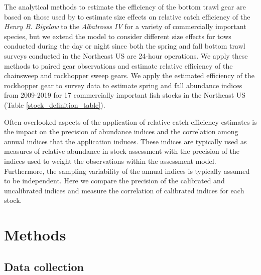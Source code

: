 \documentclass[
  12pt,
]{article}
\begin{document}
The analytical methods to estimate the efficiency of the bottom trawl
gear are based on those used by \citet{miller13} to estimate size
effects on relative catch efficiency of the \emph{Henry B. Bigelow} to
the \emph{Albatrosss IV} for a variety of commercially important
species, but we extend the model to consider different size effects for
tows conducted during the day or night since both the spring and fall
bottom trawl surveys conducted in the Northeast US are 24-hour
operations. We apply these methods to paired gear observations and
estimate relative efficiency of the chainsweep and rockhopper sweep
gears. We apply the estimated efficiency of the rockhopper gear to
survey data to estimate spring and fall abundance indices from 2009-2019
for 17 commercially important fish stocks in the Northeast US (Table
\ref{stock_definition_table}).

Often overlooked aspects of the application of relative catch efficiency
estimates is the impact on the precision of abundance indices and the
correlation among annual indices that the application induces. These
indices are typically used as measures of relative abundance in stock
assessment with the precision of the indices used to weight the
observations within the assessment model. Furthermore, the sampling
variability of the annual indices is typically assumed to be
independent. Here we compare the precision of the calibrated and
uncalibrated indices and measure the correlation of calibrated indices
for each stock.

\hypertarget{methods}{%
\section{Methods}\label{methods}}

\hypertarget{data-collection}{%
\subsection{Data collection}\label{data-collection}}
\end{document}
